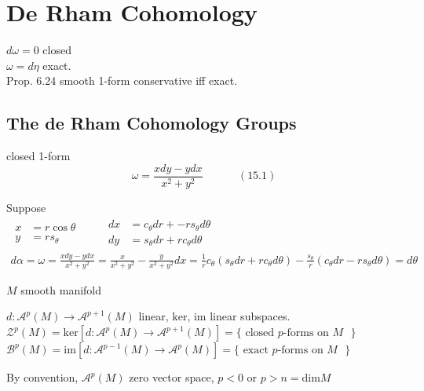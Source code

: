 \section{De Rham Cohomology}

$d\omega = 0$ closed \\
$\omega = d\eta$ exact.   \\

Prop. 6.24 smooth 1-form conservative iff exact.

\subsection*{ The de Rham Cohomology Groups}

closed 1-form 
\begin{equation}
\omega = \frac{ x dy - y dx}{ x^2 + y^2 }  \quad \quad \quad \, (15.1)
\end{equation}

Suppose 
\[
\begin{gathered}
\begin{aligned}
  x & = r\cos{\theta} \\ 
  y & = r s_{\theta} 
\end{aligned} \quad \quad \, \begin{aligned}
  dx & = c_{\theta}dr + -r s_{\theta} d\theta \\ 
  dy & = s_{\theta} dr + rc_{\theta} d\theta
\end{aligned} \\
d\alpha = \omega = \frac{ x dy - y dx}{ x^2 + y^2 } = \frac{ x}{ x^2 + y^2 } - \frac{y}{x^2 + y^2} dx = \frac{1}{r} c_{\theta} ( s_{\theta} dr + rc_{\theta} d\theta ) - \frac{s_{\theta}}{r} ( c_{\theta} dr - rs_{\theta} d\theta) = d\theta 
\end{gathered}
\]

$M$ smooth manifold

$d: \mathcal{A}^p(M) \to \mathcal{A}^{p+1}(M)$ linear, $\text{ker}$, $\text{im}$ linear subspaces.  \\
$\mathcal{Z}^p(M) = \text{ker}{ [ d : \mathcal{A}^p(M) \to \mathcal{A}^{p+1}(M)] } = \lbrace \text{ closed $p$-forms on $M$ } \rbrace$ \\
$\mathcal{B}^p(M) = \text{im}{ [ d: \mathcal{A}^{p-1}(M) \to \mathcal{A}^p(M)]} = \lbrace \text{ exact $p$-forms on $M$ } \rbrace$


By convention, $\mathcal{A}^p(M)$ zero vector space, $p < 0$ or $p>n = \text{dim}{M}$

